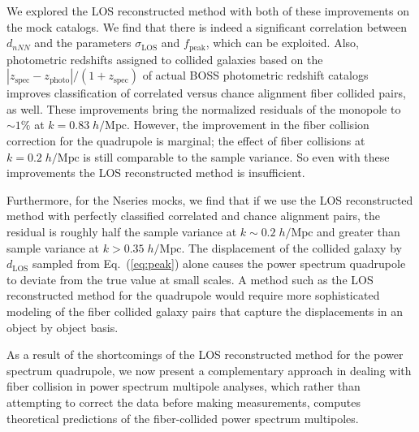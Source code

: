 We explored the LOS reconstructed method with both of these improvements 
on the mock catalogs. We find that there is indeed a significant correlation 
between $d_{nNN}$ and the parameters $\sigma_\mathrm{LOS}$ and 
$f_\mathrm{peak}$, which can be exploited. Also, photometric redshifts assigned 
to collided galaxies based on the 
$|z_\mathrm{spec} - z_\mathrm{photo}|/(1 + z_\mathrm{spec})$
of actual BOSS photometric redshift catalogs improves classification of 
correlated versus chance alignment fiber collided pairs, as well. These 
improvements bring the normalized residuals of the monopole to $\sim 1\%$
at $k = 0.83\;h/\mathrm{Mpc}$. However, the improvement in the fiber collision 
correction for the quadrupole is marginal; the effect of fiber collisions 
at $k = 0.2\;h/\mathrm{Mpc}$ is still comparable to the sample variance. So 
even with these improvements the LOS reconstructed method is insufficient. 

Furthermore, for the Nseries mocks, we find that if we use the LOS reconstructed method with 
perfectly classified correlated and chance alignment pairs, the 
residual is roughly half the sample variance at $k \sim 0.2\;h/\mathrm{Mpc}$
and greater than sample variance at $k > 0.35\;h/\mathrm{Mpc}$.
The displacement of the collided galaxy by $d_\mathrm{LOS}$ sampled from Eq.~(\ref{eq:peak}) 
alone causes the power spectrum quadrupole to deviate from the true value
at small scales. A method such as the LOS reconstructed method for the quadrupole 
would require more sophisticated modeling of the fiber collided galaxy pairs that capture the displacements in an object by object basis. 

As a result of the shortcomings of the LOS reconstructed method for the power spectrum 
quadrupole, we now present a complementary approach in dealing with fiber collision 
in power spectrum multipole analyses, which rather than attempting to correct the 
data before making measurements, computes theoretical predictions of the fiber-collided 
power spectrum multipoles. 

